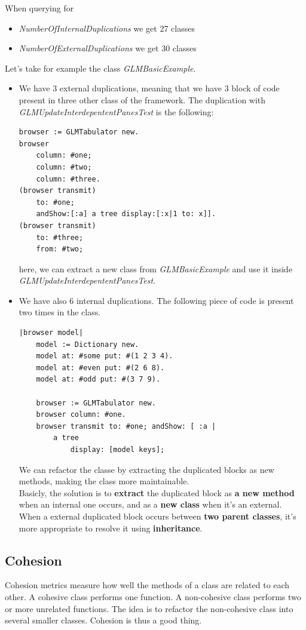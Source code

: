 \documentclass[11pt,a4paper]{article}
\begin{document}
When querying for
\begin{itemize}
\item \textit{NumberOfInternalDuplications} we get 27 classes
\item \textit{NumberOfExternalDuplications} we get 30 classes
\end{itemize}
Let's take for example the class \textit{GLMBasicExample}.
\begin{itemize}
\item We have 3 external duplications, meaning that we have 3 block of code present in three other class of the framework. The duplication with \textit{GLMUpdateInterdepententPanesTest} is the following:
\begin{lstlisting}
browser := GLMTabulator new.
browser
	column: #one;
	column: #two;
	column: #three.
(browser transmit)
	to: #one;
	andShow:[:a] a tree display:[:x|1 to: x]].
(browser transmit)
	to: #three;
	from: #two;
\end{lstlisting}
here, we can extract a new class from \textit{GLMBasicExample} and use it inside \textit{GLMUpdateInterdepententPanesTest}.

\item We have also 6 internal duplications. The following piece of code is present two times in the class.
\begin{lstlisting}
|browser model|
	model := Dictionary new.
	model at: #some put: #(1 2 3 4).
	model at: #even put: #(2 6 8).
	model at: #odd put: #(3 7 9).
	
	browser := GLMTabulator new.
	browser column: #one.
	browser transmit to: #one; andShow: [ :a |
		a tree
			display: [model keys];  
\end{lstlisting}

We can refactor the classe by extracting the duplicated blocks as new methods, making the class more maintainable.\\

Basicly, the solution is to \textbf{extract} the duplicated block as \textbf{a new method} when  an internal one occurs, and as a \textbf{new class} when it's an external. When a external duplicated block occurs between \textbf{two parent classes}, it's more appropriate to resolve it using \textbf{inheritance}. 
\end{itemize}	
\subsection{Cohesion}
Cohesion metrics measure how well the methods of a class are related to each other. A cohesive class performs one function. A non-cohesive class performs two or more unrelated functions. The idea is to refactor the non-cohesive class into several smaller classes. Cohesion is thus a good thing.
\end{document}

